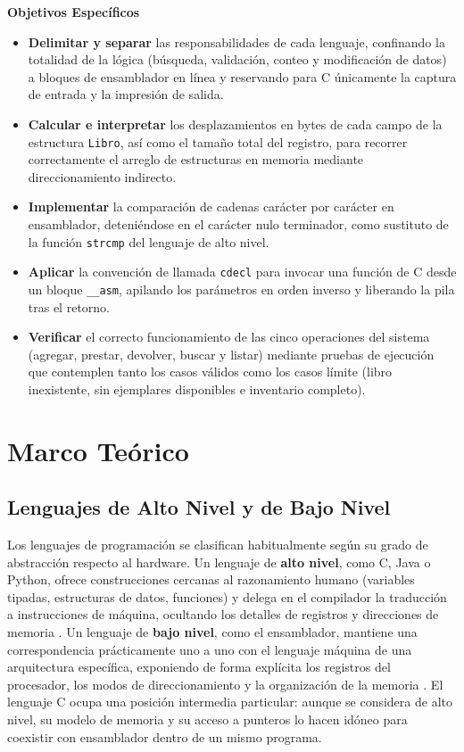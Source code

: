 \documentclass[a4paper,12pt]{article}
\begin{document}
\textbf{Objetivos Específicos}
\begin{itemize}
    \item \textbf{Delimitar y separar} las responsabilidades de cada lenguaje, confinando la totalidad de la lógica (búsqueda, validación, conteo y modificación de datos) a bloques de ensamblador en línea y reservando para C únicamente la captura de entrada y la impresión de salida.
    \item \textbf{Calcular e interpretar} los desplazamientos en bytes de cada campo de la estructura \texttt{Libro}, así como el tamaño total del registro, para recorrer correctamente el arreglo de estructuras en memoria mediante direccionamiento indirecto.
    \item \textbf{Implementar} la comparación de cadenas carácter por carácter en ensamblador, deteniéndose en el carácter nulo terminador, como sustituto de la función \texttt{strcmp} del lenguaje de alto nivel.
    \item \textbf{Aplicar} la convención de llamada \texttt{cdecl} para invocar una función de C desde un bloque \texttt{\_\_asm}, apilando los parámetros en orden inverso y liberando la pila tras el retorno.
    \item \textbf{Verificar} el correcto funcionamiento de las cinco operaciones del sistema (agregar, prestar, devolver, buscar y listar) mediante pruebas de ejecución que contemplen tanto los casos válidos como los casos límite (libro inexistente, sin ejemplares disponibles e inventario completo).
\end{itemize}

\section{Marco Teórico}
\subsection{Lenguajes de Alto Nivel y de Bajo Nivel}
Los lenguajes de programación se clasifican habitualmente según su grado de abstracción respecto al hardware. Un lenguaje de \textbf{alto nivel}, como C, Java o Python, ofrece construcciones cercanas al razonamiento humano (variables tipadas, estructuras de datos, funciones) y delega en el compilador la traducción a instrucciones de máquina, ocultando los detalles de registros y direcciones de memoria \cite{tanenbaum2013structured}. Un lenguaje de \textbf{bajo nivel}, como el ensamblador, mantiene una correspondencia prácticamente uno a uno con el lenguaje máquina de una arquitectura específica, exponiendo de forma explícita los registros del procesador, los modos de direccionamiento y la organización de la memoria \cite{irvine2020assembly}. El lenguaje C ocupa una posición intermedia particular: aunque se considera de alto nivel, su modelo de memoria y su acceso a punteros lo hacen idóneo para coexistir con ensamblador dentro de un mismo programa.
\end{document}
